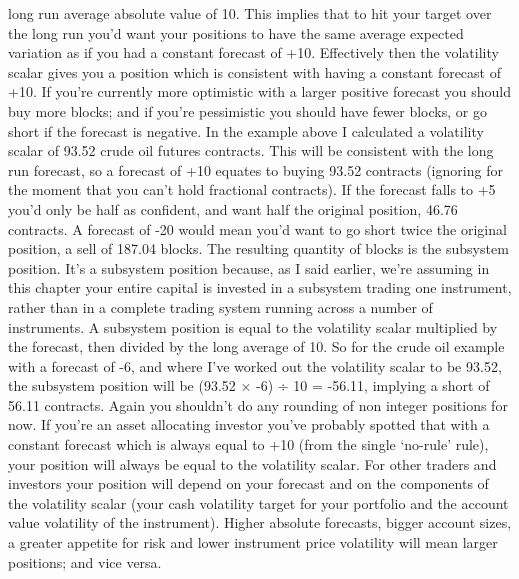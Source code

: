 \bipairgap

\begin{englishblock} long run average absolute value of 10. This implies that to hit your target over the long run you'd want your positions to have the same average expected variation as if you had a constant forecast of +10. Effectively then the volatility scalar gives you a position which is consistent with having a constant forecast of +10. If you're currently more optimistic with a larger positive forecast you should buy more blocks; and if you're pessimistic you should have fewer blocks, or go short if the forecast is negative. In the example above I calculated a volatility scalar of 93.52 crude oil futures contracts. This will be consistent with the long run forecast, so a forecast of +10 equates to buying 93.52 contracts (ignoring for the moment that you can't hold fractional contracts). If the forecast falls to +5 you'd only be half as confident, and want half the original position, 46.76 contracts. A forecast of -20 would mean you'd want to go short twice the original position, a sell of 187.04 blocks. The resulting quantity of blocks is the subsystem position. It's a subsystem position because, as I said earlier, we're assuming in this chapter your entire capital is invested in a subsystem trading one instrument, rather than in a complete trading system running across a number of instruments. A subsystem position is equal to the volatility scalar multiplied by the forecast, then divided by the long average of 10. So for the crude oil example with a forecast of -6, and where I've worked out the volatility scalar to be 93.52, the subsystem position will be (93.52 × -6) ÷ 10 = -56.11, implying a short of 56.11 contracts. Again you shouldn't do any rounding of non integer positions for now. If you're an asset allocating investor you've probably spotted that with a constant forecast which is always equal to +10 (from the single ‘no-rule' rule), your position will always be equal to the volatility scalar. For other traders and investors your position will depend on your forecast and on the components of the volatility scalar (your cash volatility target for your portfolio and the account value volatility of the instrument). Higher absolute forecasts, bigger account sizes, a greater appetite for risk and lower instrument price volatility will mean larger positions; and vice versa. \end{englishblock}

